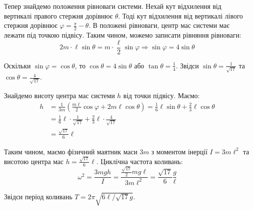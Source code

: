 \documentclass{hw_template}
\begin{document}
Тепер знайдемо положення рівноваги системи. Нехай кут відхилення від вертикалі
правого стержня дорівнює $\theta$. Тоді кут відхилення від вертикалі лівого
стержня дорівнює $\varphi = \frac{\pi}{2}-\theta$. В положені рівноваги,
центр мас системи має лежати під точкою підвісу. Таким чином, можемо записати
рівняння рівноваги:
\begin{equation*}
    2m \cdot \ell \sin \theta = m \cdot \frac{\ell}{2}\sin\varphi \Rightarrow \sin\varphi = 4\sin\theta
\end{equation*}

Оскільки $\sin\varphi = \cos\theta$, то $\cos\theta = 4\sin\theta$ або
$\tan\theta = \frac{1}{4}$. Звідси $\sin\theta=\frac{1}{\sqrt{17}}$ та 
$\cos\theta = \frac{4}{\sqrt{17}}$.

Знайдемо висоту центра мас системи $h$ від точки підвісу. Маємо:
\begin{align*}
    h &= \frac{1}{3m}\left(\frac{m\ell}{2}\cos\varphi + 2m\ell \cos \theta\right)
    = \frac{1}{6}\ell\sin\theta + \frac{2}{3}\ell \cos\theta \\ 
    &= \frac{1}{6}\ell \cdot \frac{1}{\sqrt{17}} + \frac{2}{3}\ell \cdot \frac{4}{\sqrt{17}} \\
    &= \frac{\sqrt{17}}{6}\ell
\end{align*}

Таким чином, маємо фізичний маятник маси $3m$ з моментом інерції $I = 3m\ell^2$ та
висотою центра мас $h = \frac{\sqrt{17}}{6}\ell$. Циклічна частота коливань:
\begin{equation*}
    \omega^2 = \frac{3mgh}{I} = \frac{\frac{\sqrt{17}}{2}mg\ell}{3m\ell^2} = \frac{\sqrt{17}}{6} \frac{g}{\ell}
\end{equation*}

Звідси період коливань $T=2\pi\sqrt{6\ell/\sqrt{17}g}$.
\end{document}
